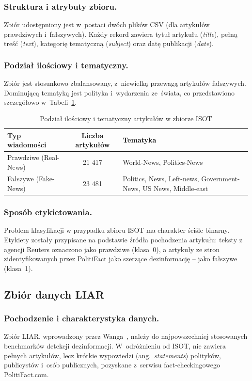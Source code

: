 \documentclass[oneside,polski,logo]{amuthesis}
\begin{document}
\subsubsection{Struktura i atrybuty zbioru.} 
Zbiór udostępniony jest w~postaci dwóch plików CSV (dla artykułów prawdziwych i~fałszywych). Każdy rekord zawiera tytuł artykułu (\textit{title}), pełną treść (\textit{text}), kategorię tematyczną (\textit{subject}) oraz datę publikacji (\textit{date}).

\subsubsection{Podział ilościowy i tematyczny.} 
Zbiór jest stosunkowo zbalansowany, z~niewielką przewagą artykułów fałszywych. Dominującą tematyką jest polityka i~wydarzenia ze~świata, co przedstawiono szczegółowo w~Tabeli~\ref{tab:isot_stat}.

\begin{table}[htbp]
\centering
\caption{Podział ilościowy i tematyczny artykułów w zbiorze ISOT}
\vspace{0.2cm}
\begin{tabularx}{\textwidth}{l c X}
\toprule
\textbf{Typ wiadomości} & \textbf{Liczba artykułów} & \textbf{Tematyka} \\
\midrule
Prawdziwe (Real-News) & 21 417 & World-News, Politics-News \\
Fałszywe (Fake-News) & 23 481 & Politics, News, Left-news, Government-News, US News, Middle-east \\
\bottomrule
\end{tabularx}
\label{tab:isot_stat}
\end{table}

\subsubsection{Sposób etykietowania.} 
Problem klasyfikacji w przypadku zbioru ISOT ma charakter ściśle binarny. Etykiety zostały przypisane na podstawie źródła pochodzenia artykułu: teksty z agencji Reuters oznaczono jako prawdziwe (klasa~0), a artykuły ze stron zidentyfikowanych przez PolitiFact jako szerzące dezinformację -- jako fałszywe (klasa~1).

\subsection{Zbiór danych LIAR}

\subsubsection{Pochodzenie i charakterystyka danych.} 
Zbiór LIAR, wprowadzony przez Wanga~\cite{wang2017liar}, należy do najpowszechniej stosowanych benchmarków detekcji dezinformacji. W~odróżnieniu od ISOT, nie zawiera pełnych artykułów, lecz krótkie wypowiedzi (ang.\ \textit{statements}) polityków, publicystów i~osób publicznych, pozyskane z~serwisu fact-checkingowego PolitiFact.com.
\end{document}
